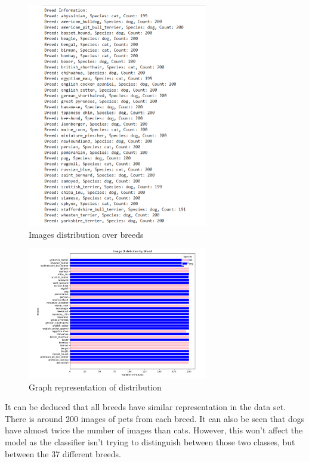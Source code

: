 \begin{figure}[h]
    \centering
    \includegraphics[width=0.7\textwidth]{figures/breeds.png}
    \caption{Images distribution over breeds}
    \label{fig:example_images}
\end{figure}
\begin{figure}[h]
    \centering
    \includegraphics[width=0.7\textwidth]{figures/data.png}
    \caption{Graph representation of distribution}
    \label{fig:example_images}
\end{figure}
\clearpage
\noindent
It can be deduced that all breeds have similar representation in the data set. There is around 200 images of pets from each breed. It can also be seen that dogs have almost twice the number of images than cats. However, this won't affect the  model as the classifier isn’t trying to distinguish between those two classes, but between the 37 different breeds.
